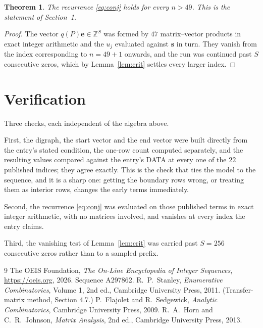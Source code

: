 \documentclass[11pt,a4paper]{article}
\theoremstyle{plain}
\newtheorem{theorem}{Theorem}
\theoremstyle{definition}
\begin{document}
\begin{theorem}
The recurrence \eqref{eq:conj} holds for every $n>49$. This is the statement of
Section~1.
\end{theorem}

\begin{proof}
The vector $q(P)\mathbf{e}\in\mathbb{Z}^{S}$ was formed by $47$ matrix--vector
products in exact integer arithmetic and the $u_j$ evaluated against $\mathbf{s}$ in turn.
They vanish from the index corresponding to $n=49+1$ onwards, and the run was continued
past $S$ consecutive zeros, which by Lemma~\ref{lem:crit} settles every larger index.
\end{proof}

\section{Verification}

Three checks, each independent of the algebra above.

First, the digraph, the start vector and the end vector were built directly from the
entry's stated condition, the one-row count computed separately, and the resulting values
compared against the entry's DATA at every one of the $22$ published indices; they
agree exactly. This is the check that ties the model to the sequence, and it is a sharp one:
getting the boundary rows wrong, or treating them as interior rows, changes the early terms
immediately.

Second, the recurrence \eqref{eq:conj} was evaluated on those published terms in exact
integer arithmetic, with no matrices involved, and vanishes at every index the entry claims.

Third, the vanishing test of Lemma~\ref{lem:crit} was carried past $S=256$ consecutive
zeros rather than to a sampled prefix.

\begin{thebibliography}{9}
 The OEIS Foundation, \emph{The On-Line Encyclopedia of Integer
Sequences}, \url{https://oeis.org}, 2026. Sequence A297862.
 R.~P.~Stanley, \emph{Enumerative Combinatorics}, Volume 1, 2nd ed.,
Cambridge University Press, 2011. (Transfer-matrix method, Section 4.7.)
 P.~Flajolet and R.~Sedgewick, \emph{Analytic Combinatorics}, Cambridge
University Press, 2009.
 R.~A.~Horn and C.~R.~Johnson, \emph{Matrix Analysis}, 2nd ed., Cambridge
University Press, 2013.
\end{thebibliography}
\end{document}
